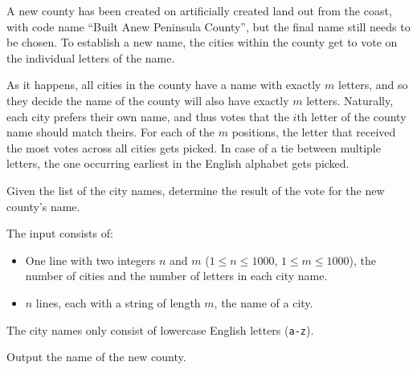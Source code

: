 

\newcommand{\maxn}{1000}
\newcommand{\maxm}{1000}


A new county has been created on artificially created land out from the coast,
with code name ``Built Anew Peninsula County'',
but the final name still needs to be chosen.
To establish a new name, the cities within the county get to vote on the individual letters of the name.

As it happens, all cities in the county have a name with exactly $m$ letters,
and so they decide the name of the county will also have exactly $m$ letters.
Naturally, each city prefers their own name, and thus votes that the $i$th letter of the county name should match theirs.
For each of the $m$ positions, the letter that received the most votes across all cities gets picked.
In case of a tie between multiple letters, the one occurring earliest in the English alphabet gets picked.

Given the list of the city names, determine the result of the vote for
the new county's name.


\begin{Input}
    The input consists of:
    \begin{itemize}
        \item One line with two integers $n$ and $m$ ($1\leq n\leq \maxn$, $1 \leq m \leq \maxm$),
            the number of cities and the number of letters in each city name.
        \item $n$ lines, each with a string of length $m$, the name of a city.
    \end{itemize}
    The city names only consist of lowercase English letters (\texttt{a-z}).
\end{Input}

\begin{Output}
    Output the name of the new county.
\end{Output}
